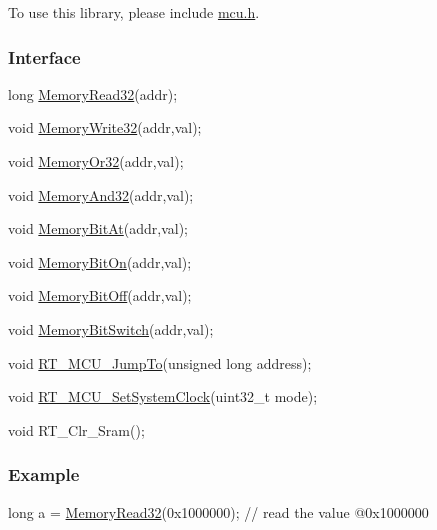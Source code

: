 To use this library, please include {\ttfamily \mbox{\hyperlink{a00020}{mcu.\+h}}}.

\subsubsection*{Interface}


\begin{DoxyCode}
\textcolor{keywordtype}{long} \mbox{\hyperlink{a00020_a2d484dc15bdf30ee11ab3b05f31f0e16}{MemoryRead32}}(addr);

\textcolor{keywordtype}{void} \mbox{\hyperlink{a00020_a6b9732365b12e48ddb89fe1028b975b0}{MemoryWrite32}}(addr,val);

\textcolor{keywordtype}{void} \mbox{\hyperlink{a00020_a27874a97deab7cecdde5ddecf466e31e}{MemoryOr32}}(addr,val);

\textcolor{keywordtype}{void} \mbox{\hyperlink{a00020_ad87cedffcaadc51db22594fce55173d4}{MemoryAnd32}}(addr,val);

\textcolor{keywordtype}{void} \mbox{\hyperlink{a00020_afc530c7e6b49b0ca97c1ad9dac1c4750}{MemoryBitAt}}(addr,val);

\textcolor{keywordtype}{void} \mbox{\hyperlink{a00020_a99a602346038b54068758ef00c42d1b6}{MemoryBitOn}}(addr,val);

\textcolor{keywordtype}{void} \mbox{\hyperlink{a00020_a04c34919a950117ae7da2dc5a235622b}{MemoryBitOff}}(addr,val);

\textcolor{keywordtype}{void} \mbox{\hyperlink{a00020_ae49e41753dbce64185d380d307ade78d}{MemoryBitSwitch}}(addr,val);

\textcolor{keywordtype}{void} \mbox{\hyperlink{a00020_aa106e3c9181a65a83156bda31f4f61e9}{RT\_MCU\_JumpTo}}(\textcolor{keywordtype}{unsigned} \textcolor{keywordtype}{long} address);

\textcolor{keywordtype}{void} \mbox{\hyperlink{a00020_a1e578ce669735935a1d505c0edf98221}{RT\_MCU\_SetSystemClock}}(uint32\_t mode);

\textcolor{keywordtype}{void} RT\_Clr\_Sram();
\end{DoxyCode}


\subsubsection*{Example}


\begin{DoxyCode}
\textcolor{keywordtype}{long} a = \mbox{\hyperlink{a00020_a2d484dc15bdf30ee11ab3b05f31f0e16}{MemoryRead32}}(0x1000000);      \textcolor{comment}{// read the value @0x1000000}
\end{DoxyCode}
 
